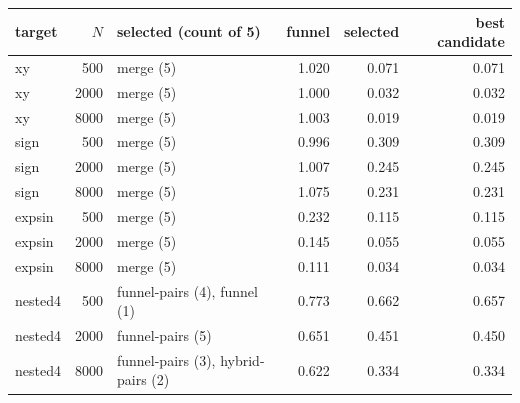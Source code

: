 \begin{tabular}{@{}lrlrrr@{}}\toprule
target & $N$ & selected (count of 5) & funnel & selected & best candidate\\\midrule
xy & 500 & merge (5) & 1.020 & 0.071 & 0.071\\
xy & 2000 & merge (5) & 1.000 & 0.032 & 0.032\\
xy & 8000 & merge (5) & 1.003 & 0.019 & 0.019\\
sign & 500 & merge (5) & 0.996 & 0.309 & 0.309\\
sign & 2000 & merge (5) & 1.007 & 0.245 & 0.245\\
sign & 8000 & merge (5) & 1.075 & 0.231 & 0.231\\
expsin & 500 & merge (5) & 0.232 & 0.115 & 0.115\\
expsin & 2000 & merge (5) & 0.145 & 0.055 & 0.055\\
expsin & 8000 & merge (5) & 0.111 & 0.034 & 0.034\\
nested4 & 500 & funnel-pairs (4), funnel (1) & 0.773 & 0.662 & 0.657\\
nested4 & 2000 & funnel-pairs (5) & 0.651 & 0.451 & 0.450\\
nested4 & 8000 & funnel-pairs (3), hybrid-pairs (2) & 0.622 & 0.334 & 0.334\\
\bottomrule\end{tabular}